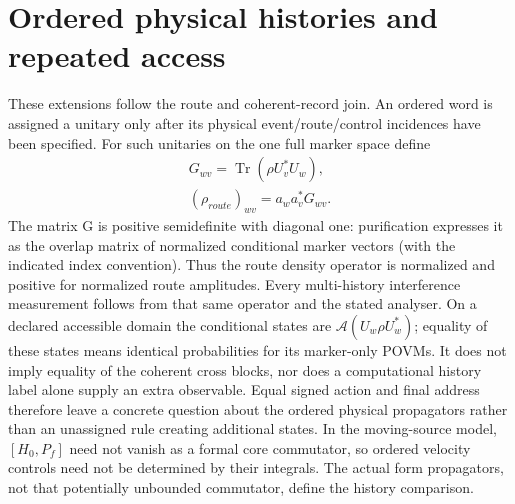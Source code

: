 \section{Ordered physical histories and repeated access}
\label{sec:new-histories}
These extensions follow the route and coherent-record join. An ordered
word is assigned a unitary only after its physical event/route/control
incidences have been specified. For such unitaries on the one full marker
space define
\[\begin{gathered}
G_{wv}=\operatorname{Tr}(\rho U_v^*U_w),\\
 (\rho_{route})_{wv}=a_w a_v^*G_{wv}.
\end{gathered}\]
The matrix G is positive semidefinite with diagonal one: purification
expresses it as the overlap matrix of normalized conditional marker
vectors (with the indicated index convention). Thus the route density
operator is normalized and positive for normalized route amplitudes.
Every multi-history interference measurement follows from that same
operator and the stated analyser. On a declared accessible domain the
conditional states are \(\mathcal A(U_w\rho U_w^*)\); equality of these
states means identical probabilities for its marker-only POVMs.
It does not imply equality of the coherent cross blocks, nor does a
computational history label alone supply an extra observable.
Equal signed action and final address therefore leave a concrete
question about the ordered physical propagators rather than an
unassigned rule creating additional states. In the moving-source model,
\([H_0,P_f]\) need not vanish as a formal core commutator, so ordered
velocity controls need not be determined by their integrals. The actual
form propagators, not that potentially unbounded commutator, define
the history comparison.

